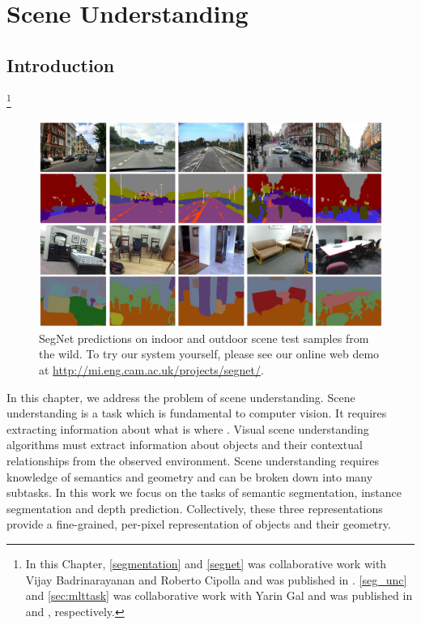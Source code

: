 

\chapter{Scene Understanding}
\label{scene_understanding}

\graphicspath{{Chapter2/Figs/}}

\section{Introduction}

{\let\thefootnote\relax\footnote{{In this Chapter, \cref{segmentation} and \cref{segnet} was collaborative work with Vijay Badrinarayanan and Roberto Cipolla and was published in \citep{badrinarayanan2017segnet}. \cref{seg_unc} and \cref{sec:mlttask} was collaborative work with Yarin Gal and was published in \citep{kendall2017uncertainties} and \citep{kendall2017multi}, respectively.}}}

\begin{figure}[t]
\center
\includegraphics[width=\textwidth]{segnet/CamVidTeaserwithIndoorScenes.jpg}
\caption[SegNet semantic segmentation predictions on indoor and outdoor scenes.]{SegNet predictions on indoor and outdoor scene test samples from the wild. To try our system yourself, please see our online web demo at \url{http://mi.eng.cam.ac.uk/projects/segnet/}.}
\label{Teaser}
\end{figure}

In this chapter, we address the problem of scene understanding. Scene understanding is a task which is fundamental to computer vision. It requires extracting information about what is where \citep{marr1982vision}. Visual scene understanding algorithms must extract information about objects and their contextual relationships from the observed environment. Scene understanding requires knowledge of semantics and geometry and can be broken down into many subtasks. In this work we focus on the tasks of semantic segmentation, instance segmentation and depth prediction. Collectively, these three representations provide a fine-grained, per-pixel representation of objects and their geometry.

